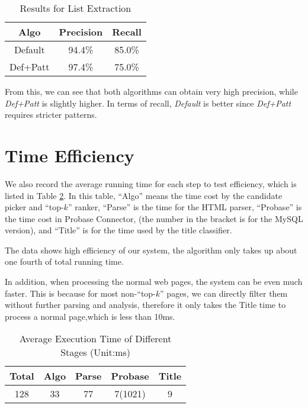 \begin{table}
\centering
\begin{tabular}{|c||c|c|}
\hline
Algo & Precision & Recall\\\hline
Default & 94.4\% & 85.0\% \\
Def+Patt & 97.4\% & 75.0\% \\
\hline
\end{tabular}
\caption{Results for List Extraction}
\label{tab:listRes}
\end{table}

From this, we can see that both algorithms can obtain very high precision,
while {\em Def+Patt} is slightly higher.
In terms of recall, {\em Default} is better since {\em Def+Patt}
requires stricter patterns.

\section{Time Efficiency}

We also record the average running time for each step to test efficiency,
which is listed in Table \ref{tab:TimeCostDistribution}.
In this table, ``Algo'' means the time cost by the candidate picker and ``top-$k$'' ranker,
``Parse'' is the time for the HTML parser, ``Probase'' is the time cost in Probase Connector, (the number in the bracket is for the MySQL version), and ``Title'' is for the time used by the title classifier.

The data shows high efficiency of our system,
the algorithm only takes up about one fourth of total running time.

In addition, when processing the normal web pages, the system can be even much faster. This is because for most non-``top-$k$'' pages, we can directly filter them without further parsing and analysis, therefore it only takes the Title time to process a normal page,which is less than 10ms.

\begin{table}[tb]
\centering
\caption{Average Execution Time of Different Stages (Unit:ms)}
\label{tab:TimeCostDistribution}
\begin{tabular}{|c||c|c|c|c|}
\hline
\textbf{Total} & Algo & Parse & Probase & Title \\\hline
128 & 33 & 77 & 7(1021) & 9\\\hline

\end{tabular}
\end{table}

